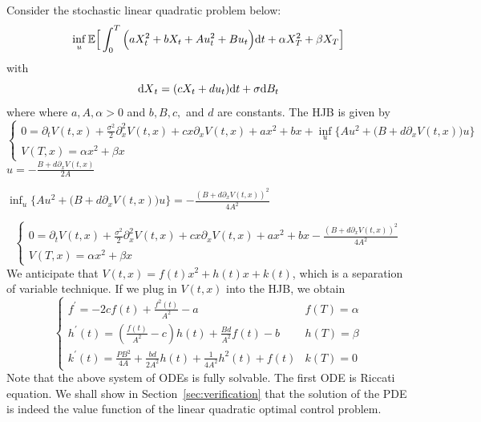 \documentclass[11pt]{book}
\newcommand{\dd}{\text{\normalfont d}}
\newcommand{\dt}{\text{\normalfont d}t}
\newcommand{\dX}{\text{\normalfont d}X}
\begin{document}
\begin{eg}\label{eg:LQ_drift}
    Consider the stochastic linear quadratic problem below:
    \begin{equation}
        \inf_u\mathbb{E}\Big[\int_0^T \Big(aX_t^2+bX_t +Au_t^2 + Bu_t\Big){\dt}+\alpha X_T^2+\beta X_T\Big]
    \end{equation}
    with 
    \begin{equation}
        {\dX}_t=(cX_t+du_t){{\dt}}+\sigma {\dd}B_t
    \end{equation}
where where $a,A, \alpha>0$ and $b,B,c,$ and $d$ are constants.   The HJB is given by 
\begin{equation}
    \begin{cases}
        0=\partial_t V(t,x) +\frac{\sigma^2}{2}\partial^2_x V(t,x)+ cx\partial_x V(t,x) + a x^2 + bx +\inf_{u}\Big\{Au^2 +\big(B+d\partial_x V(t,x)\big)u \Big\}\\
        V(T,x)=\alpha x^2 + \beta x
    \end{cases}
\end{equation}
$u =-\frac{B+d\partial_x V(t,x)}{2A}$

$\inf_u\{Au^2 +\big(B+d\partial_x V(t,x)\big)u\} = -\frac{(B+d\partial_x V(t,x))^2}{4A^2}$

\begin{equation}
    \begin{cases}
        0=\partial_t V(t,x) +\frac{\sigma^2}{2}\partial^2_x V(t,x)+ cx\partial_x V(t,x) + a x^2 + bx -\frac{(B+d\partial_x V(t,x))^2}{4A^2}\\
        V(T,x)=\alpha x^2 + \beta x
    \end{cases}
\end{equation}
We anticipate that $V(t,x)=f(t)x^2+h(t)x+k(t)$, which is a separation of variable technique. If we plug in $V(t,x)$  into the HJB, we obtain
\begin{equation}
    \begin{cases}
       f^\prime = -2cf(t) + \frac{f^{2}(t)}{A^2} -a& f(T)=\alpha\\
       h^{\prime}(t)= (\frac{f(t)}{A^2}-c)h(t)+\frac{Bd}{A^2}f(t)-b& h(T)=\beta\\
       k^{\prime}(t)=\frac{PB^2}{4A}+\frac{bd}{2A^2}h(t)+\frac{1}{4A^2}h^2(t)+f(t)&k(T)=0
    \end{cases}
\end{equation}
Note that the above system of ODEs is fully solvable. The first ODE is Riccati equation.
We shall show in Section~\ref{sec:verification} that the solution of the PDE is indeed the value function of the linear quadratic optimal control problem.
\end{eg}
\end{document}
